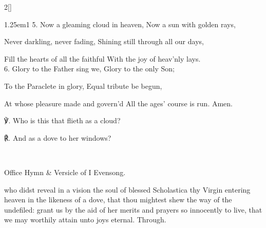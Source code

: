 \begin{paracol}{2}[]
\begin{hangparas}{1.25em}{1}
5. Now a gleaming cloud in heaven, Now a sun with golden rays,

Never darkling, never fading, Shining still through all our days,

Fill the hearts of all the faithful With the joy of heav'nly lays.\\

6. Glory to the Father sing we, Glory to the only Son;

To the Paraclete in glory, Equal tribute be begun,

At whose pleasure made and govern'd All the ages' course is run. Amen.\\
\end{hangparas}

℣. Who is this that flieth as a cloud? 

℟. And as a dove to her windows?


\secondEvensong
{}\\

\vspace{-1\baselineskip}

\begin{rubric}
	Office Hymn \& Versicle of I Evensong.
\end{rubric}


\collect
{} who didst reveal in a vision the soul of blessed Scholastica thy Virgin entering heaven in the likeness of a dove, that thou mightest shew the way of the undefiled: grant us by the aid of her merits and prayers so innocently to live, that we may worthily attain unto joys eternal. Through.

\switchcolumn


\end{paracol}
